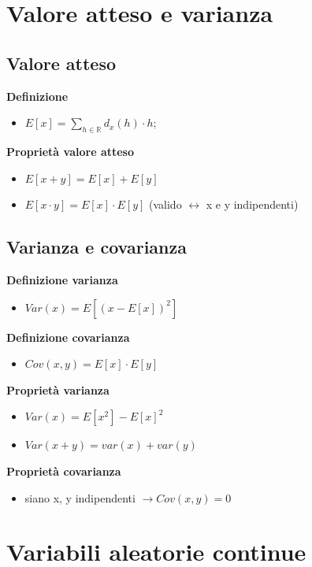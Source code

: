 \newpage

\section{Valore atteso e varianza}
\subsection{Valore atteso}
\textbf{Definizione}
\begin{itemize}
	\item $E[x] = \displaystyle \sum_{h \in \mathbb{R}} d_{x}(h) \cdot h $; 
\end{itemize} 

\begin{flushleft}
	\textbf{Proprietà valore atteso}
\end{flushleft}
\begin{itemize}
	\item $E[x + y] = E[x] + E[y]$
	\item $E[x \cdot y] = E[x] \cdot E[y]$ (valido $\leftrightarrow$ x e y indipendenti)
\end{itemize}
\subsection{Varianza e covarianza}
\textbf{Definizione varianza} 
\begin{itemize}
	\item $Var(x) = E[(x - E[x])^2]$
\end{itemize}
\textbf{Definizione covarianza} 
\begin{itemize}
	\item $Cov(x, y) = E[x] \cdot E[y]$ 
\end{itemize}

\begin{flushleft}
	\textbf{Proprietà varianza}
\end{flushleft} 
\begin{itemize}
	\item $Var(x) = E[x^2] - E[x]^2$
	\item $Var(x + y) = var(x) + var(y)$
\end{itemize}
\textbf{Proprietà covarianza}
\begin{itemize}
	\item siano x, y indipendenti $\rightarrow Cov(x, y) = 0$
\end{itemize}

\newpage
\section{Variabili aleatorie continue}
